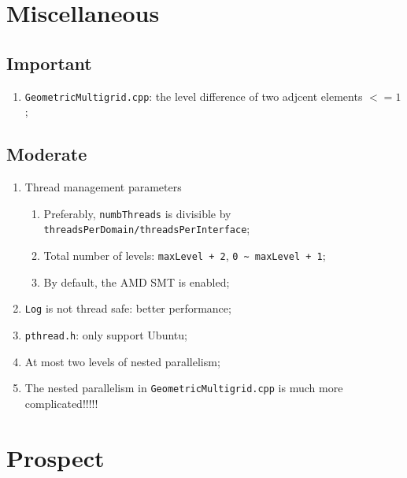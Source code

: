\section{Miscellaneous}

\subsection{Important}

\begin{enumerate}[label=$\blacksquare$]
\item \lstinline{GeometricMultigrid.cpp}: the level difference of two adjcent elements $<= 1$;
\end{enumerate}

\subsection{Moderate}

\begin{enumerate}[label=$\blacksquare$]
\item Thread management parameters
  \begin{enumerate}[label=$\bullet$]
  \item Preferably, \lstinline{numbThreads} is divisible by \lstinline{threadsPerDomain/threadsPerInterface};
  \item Total number of levels: \lstinline{maxLevel + 2}, \lstinline{0 ~ maxLevel + 1};
  \item By default, the AMD SMT is enabled;
  \end{enumerate}
\item \lstinline{Log} is not thread safe: better performance;
\item \lstinline{pthread.h}: only support Ubuntu;
\item At most two levels of nested parallelism;
\item The nested parallelism in \lstinline{GeometricMultigrid.cpp} is much more complicated!!!!!
\end{enumerate}

\section{Prospect}

